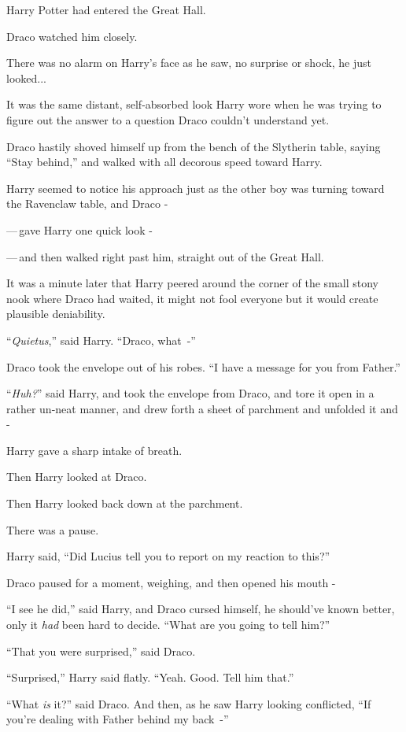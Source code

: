 Harry Potter had entered the Great Hall.

Draco watched him closely.

There was no alarm on Harry's face as he saw, no surprise or shock, he just looked...

It was the same distant, self-absorbed look Harry wore when he was trying to figure out the answer to a question Draco couldn't understand yet.

Draco hastily shoved himself up from the bench of the Slytherin table, saying ``Stay behind,'' and walked with all decorous speed toward Harry.

Harry seemed to notice his approach just as the other boy was turning toward the Ravenclaw table, and Draco -

---\,gave Harry one quick look -

---\,and then walked right past him, straight out of the Great Hall.

It was a minute later that Harry peered around the corner of the small stony nook where Draco had waited, it might not fool everyone but it would create plausible deniability.

``\emph{Quietus},'' said Harry. ``Draco, what~-''

Draco took the envelope out of his robes. ``I have a message for you from Father.''

``\emph{Huh?}'' said Harry, and took the envelope from Draco, and tore it open in a rather un-neat manner, and drew forth a sheet of parchment and unfolded it and -

Harry gave a sharp intake of breath.

Then Harry looked at Draco.

Then Harry looked back down at the parchment.

There was a pause.

Harry said, ``Did Lucius tell you to report on my reaction to this?''

Draco paused for a moment, weighing, and then opened his mouth -

``I see he did,'' said Harry, and Draco cursed himself, he should've known better, only it \emph{had} been hard to decide. ``What are you going to tell him?''

``That you were surprised,'' said Draco.

``Surprised,'' Harry said flatly. ``Yeah. Good. Tell him that.''

``What \emph{is} it?'' said Draco. And then, as he saw Harry looking conflicted, ``If you're dealing with Father behind my back~-''

